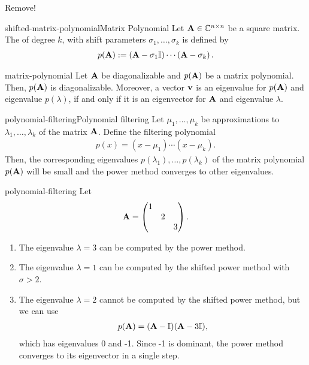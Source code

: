 \begin{intro}
  \begin{todo}
    Remove!
  \end{todo}
\end{intro}

\begin{Definition*}{shifted-matrix-polynomial}{Matrix Polynomial}
  Let \(\mathbf A \in \mathbb C^{n \times n}\) be a square matrix.
  The  of degree \(k\), with shift parameters \(\sigma_1, \ldots, \sigma_k\) is defined by
  \begin{gather}
    p(\mathbf A) := \left(\mathbf A - \sigma_1 \mathbb I \right) \cdots \left(\mathbf A - \sigma_k\right).    
  \end{gather}
\end{Definition*}

\begin{Lemma}{matrix-polynomial}
  Let $\mathbf A$ be diagonalizable and $p(\mathbf A)$ be a matrix
  polynomial. Then, $p(\mathbf A)$ is diagonalizable. Moreover, a vector
  $\mathbf v$ is an eigenvalue for $p(\mathbf A)$ and eigenvalue $p(\lambda)$,
  if and only if it is an eigenvector for $\mathbf A$ and eigenvalue $\lambda$.
\end{Lemma}

\begin{Algorithm*}{polynomial-filtering}{Polynomial filtering}
  Let $\mu_1,\dots,\mu_k$ be approximations to  $\lambda_1,\dots,\lambda_k$ of the matrix
  $\mathbf A$. Define the filtering polynomial
  \begin{gather}
    p(x) = (x-\mu_1)\cdots(x-\mu_k).
  \end{gather}
  Then, the corresponding eigenvalues
  $p(\lambda_1),\dots,p(\lambda_k)$ of the matrix polynomial
  $p(\mathbf A)$ will be small and the power method converges to other
  eigenvalues.
\end{Algorithm*}

\begin{Example}{polynomial-filtering}
  Let
  \begin{gather}
    \mathbf A =
    \begin{pmatrix}
      1&&\\ &2& \\ &&3      
    \end{pmatrix}.
  \end{gather}
  \begin{enumerate}
  \item The eigenvalue $\lambda=3$ can be computed by the power method.
  \item The eigenvalue $\lambda=1$ can be computed by the shifted power method with $\sigma>2$.
  \item The eigenvalue $\lambda=2$ cannot be computed by the shifted power method, but we can use
    \begin{gather}
      p(\mathbf A) = (\mathbf A-\mathbb I)(\mathbf A-3\mathbb I),
    \end{gather}
    which has eigenvalues 0 and -1. Since -1 is dominant, the power
    method converges to its eigenvector in a single step.
  \end{enumerate}
\end{Example}


